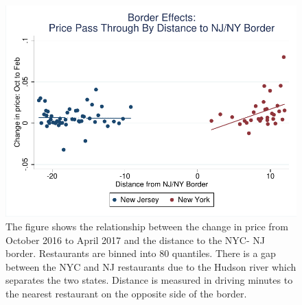 \documentclass[11pt]{article}
\begin{document}
\begin{figure}[H]
\centering
\includegraphics[scale=.75]{gh_dist.pdf}
\caption[Short Heading]{
The figure shows the relationship between the change in price from October 2016 to April 2017 and the distance to the NYC- NJ border. Restaurants are binned into 80 quantiles. There is a gap between the NYC and NJ restaurants due to the Hudson river which separates the two states. Distance is measured in driving minutes to the nearest restaurant on the opposite side of the border. 
}

\end{figure}
%
%
%
%
\end{document}
